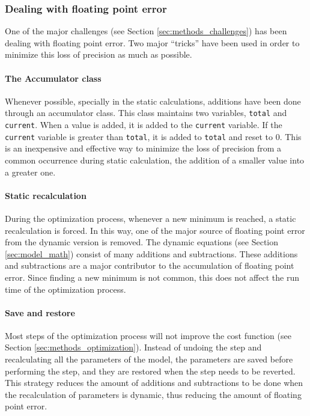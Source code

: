 \subsubsection{Dealing with floating point error}

One of the major challenges (see Section \ref{sec:methods_challenges}) has been dealing with floating point error.
Two major ``tricks'' have been used in order to minimize this loss of precision as much as possible.

\paragraph{The Accumulator class}
Whenever possible, specially in the static calculations, additions have been done through an accumulator class.
This class maintains two variables, \texttt{total} and \texttt{current}.
When a value is added, it is added to the \texttt{current} variable.
If the \texttt{current} variable is greater than \texttt{total}, it is added to \texttt{total} and reset to 0.
This is an inexpensive and effective way to minimize the loss of precision from a common occurrence during static calculation, the addition of a smaller value into a greater one.

\paragraph{Static recalculation}
During the optimization process, whenever a new minimum is reached, a static recalculation is forced.
In this way, one of the major source of floating point error from the dynamic version is removed.
The dynamic equations (see Section \ref{sec:model_math}) consist of many additions and subtractions.
These additions and subtractions are a major contributor to the accumulation of floating point error.
Since finding a new minimum is not common, this does not affect the run time of the optimization process.

\paragraph{Save and restore}
Most steps of the optimization process will not improve the cost function (see Section \ref{sec:methods_optimization}).
Instead of undoing the step and recalculating all the parameters of the model, the parameters are saved before performing the step, and they are restored when the step needs to be reverted.
This strategy reduces the amount of additions and subtractions to be done when the recalculation of parameters is dynamic, thus reducing the amount of floating point error.


